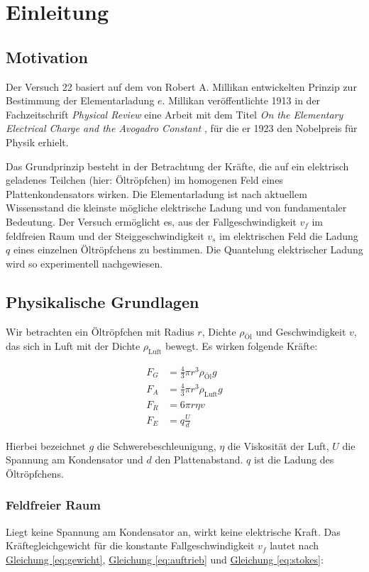 \chapter{Einleitung}

\section{Motivation}
Der Versuch 22 basiert auf dem von Robert A. Millikan entwickelten Prinzip zur Bestimmung der Elementarladung $e$. Millikan veröffentlichte 1913 in der Fachzeitschrift \textit{Physical Review} eine Arbeit mit dem Titel \textit{On the Elementary Electrical Charge and the Avogadro Constant} \cite{millikan1913}, für die er 1923 den Nobelpreis für Physik erhielt. 

Das Grundprinzip besteht in der Betrachtung der Kräfte, die auf ein elektrisch geladenes Teilchen (hier: Öltröpfchen) im homogenen Feld eines Plattenkondensators wirken. Die Elementarladung ist nach aktuellem Wissensstand die kleinste mögliche elektrische Ladung und von fundamentaler Bedeutung. Der Versuch ermöglicht es, aus der Fallgeschwindigkeit $v_f$ im feldfreien Raum und der Steiggeschwindigkeit $v_s$ im elektrischen Feld die Ladung $q$ eines einzelnen Öltröpfchens zu bestimmen. Die Quantelung elektrischer Ladung wird so experimentell nachgewiesen.

\section{Physikalische Grundlagen}
\cite{skript25}
Wir betrachten ein Öltröpfchen mit Radius $r$, Dichte $\rho_\text{Öl}$ und Geschwindigkeit $v$, das sich in Luft mit der Dichte $\rho_\text{Luft}$ bewegt. Es wirken folgende Kräfte:

\begin{align}
    F_G &= \frac{4}{3}\pi r^3 \rho_\text{Öl} g \label{eq:gewicht} \\
    F_A &= \frac{4}{3}\pi r^3 \rho_\text{Luft} g \label{eq:auftrieb} \\
    F_R &= 6 \pi r \eta v \label{eq:stokes} \\
    F_E &= q \frac{U}{d} \label{eq:elektrisch}
\end{align}

Hierbei bezeichnet $g$ die Schwerebeschleunigung, $\eta$ die Viskosität der Luft, $U$ die Spannung am Kondensator und $d$ den Plattenabstand. $q$ ist die Ladung des Öltröpfchens.

\subsection*{Feldfreier Raum}
Liegt keine Spannung am Kondensator an, wirkt keine elektrische Kraft. Das Kräftegleichgewicht für die konstante Fallgeschwindigkeit $v_f$ lautet nach \hyperref[eq:gewicht]{Gleichung \ref*{eq:gewicht}}, \hyperref[eq:auftrieb]{Gleichung \ref*{eq:auftrieb}} und \hyperref[eq:stokes]{Gleichung \ref*{eq:stokes}}:

